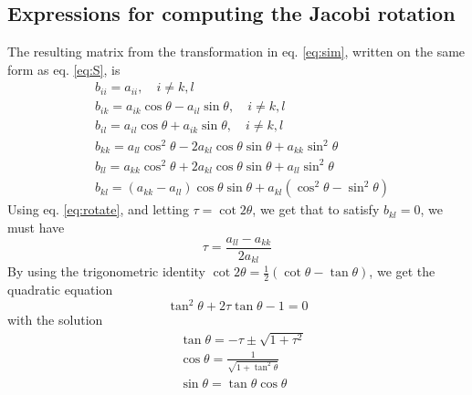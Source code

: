 \subsection*{Expressions for computing the Jacobi rotation}
 The resulting matrix from the transformation in eq. \ref{eq:sim}, written on the same form as eq. \ref{eq:S}, is 
 \begin{equation}\label{eq:rotate}
 \begin{split}
 &b_{ii} = a_{ii}, \quad i\neq k,l  \\
 &b_{ik} = a_{ik}\cos{\theta} - a_{il}\sin \theta, \quad i\neq k,l \\
 &b_{il} = a_{il}\cos{\theta} + a_{ik}\sin \theta, \quad i\neq k,l \\
 &b_{kk} = a_{ll}\cos^2{\theta} - 2a_{kl}\cos{\theta}\sin{\theta} + a_{kk}\sin^2{\theta}  \\
 &b_{ll} = a_{kk}\cos^2{\theta} + 2a_{kl}\cos{\theta}\sin{\theta} + a_{ll}\sin^2{\theta}  \\
 &b_{kl} = \left( a_{kk} - a_{ll}\right) \cos{\theta}\sin{\theta} + a_{kl}\left( \cos^2\theta - \sin^2\theta\right) 
 \end{split}
 \end{equation}
 Using eq. \ref{eq:rotate}, and letting $\tau = \cot{2\theta}$, we get that to satisfy $b_{kl}=0$, we must have 
 \begin{equation}
  \tau =  \frac{a_{ll}-a_{kk}}{2a_{kl}} 
 \end{equation}
 By using the trigonometric identity $\cot{2\theta} = \frac{1}{2}\left( \cot \theta - \tan \theta\right)$, we get the quadratic equation
 \begin{equation}
 \tan^2 \theta + 2\tau \tan \theta - 1 = 0
 \end{equation}
 with the solution
 \begin{equation}
 \begin{split}
 &\tan \theta = -\tau \pm \sqrt{1+\tau^2} \\
 &\cos \theta = \frac{1}{\sqrt{1+\tan^2 \theta}} \\
 &\sin \theta = \tan \theta \cos \theta 
 \end{split}
 \end{equation}
